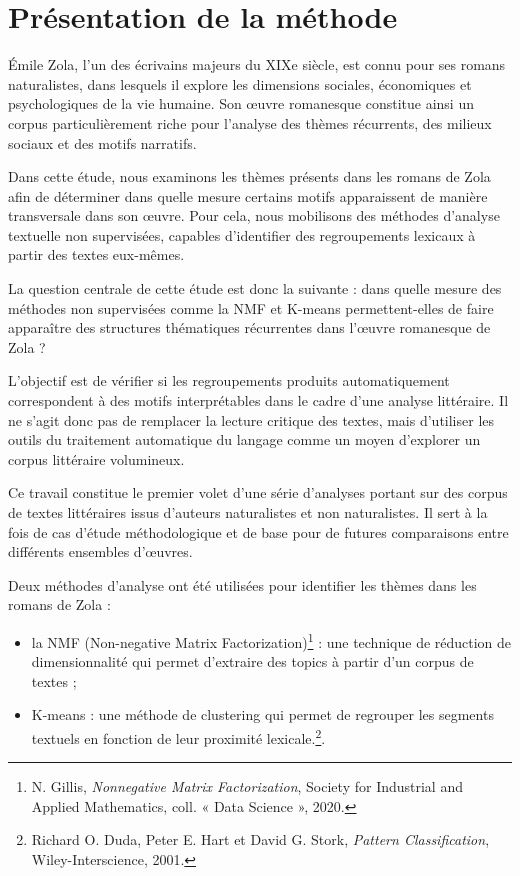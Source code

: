 \section{Présentation de la méthode}

Émile Zola, l'un des écrivains majeurs du XIXe siècle, est connu pour ses romans naturalistes, dans lesquels il explore les dimensions sociales, économiques et psychologiques de la vie humaine. Son œuvre romanesque constitue ainsi un corpus particulièrement riche pour l'analyse des thèmes récurrents, des milieux sociaux et des motifs narratifs.

Dans cette étude, nous examinons les thèmes présents dans les romans de Zola afin de déterminer dans quelle mesure certains motifs apparaissent de manière transversale dans son œuvre. Pour cela, nous mobilisons des méthodes d'analyse textuelle non supervisées, capables d'identifier des regroupements lexicaux à partir des textes eux-mêmes.

La question centrale de cette étude est donc la suivante : dans quelle mesure des méthodes non supervisées comme la NMF et K-means permettent-elles de faire apparaître des structures thématiques récurrentes dans l'œuvre romanesque de Zola ?

L'objectif est de vérifier si les regroupements produits automatiquement correspondent à des motifs interprétables dans le cadre d'une analyse littéraire. Il ne s'agit donc pas de remplacer la lecture critique des textes, mais d'utiliser les outils du traitement automatique du langage comme un moyen d'explorer un corpus littéraire volumineux.

Ce travail constitue le premier volet d'une série d'analyses portant sur des corpus de textes littéraires issus d'auteurs naturalistes et non naturalistes. Il sert à la fois de cas d'étude méthodologique et de base pour de futures comparaisons entre différents ensembles d'œuvres.

Deux méthodes d'analyse ont été utilisées pour identifier les thèmes dans les romans de Zola :

\begin{itemize}
    \item la NMF (Non-negative Matrix Factorization)\footnote{N. Gillis, \textit{Nonnegative Matrix Factorization}, Society for Industrial and Applied Mathematics, coll. « Data Science », 2020.} : une technique de réduction de dimensionnalité qui permet d'extraire des topics à partir d'un corpus de textes ;
    \item K-means : une méthode de clustering qui permet de regrouper les segments textuels en fonction de leur proximité lexicale.\footnote{Richard O. Duda, Peter E. Hart et David G. Stork, \textit{Pattern Classification}, Wiley-Interscience, 2001.}.
\end{itemize}

